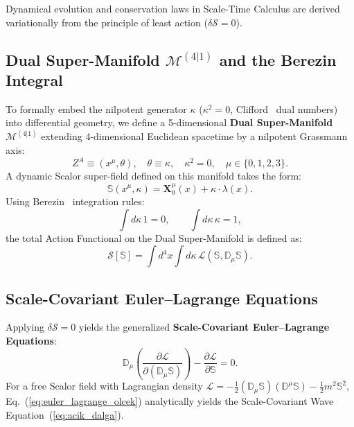 \documentclass[11pt,a4paper]{article}
\begin{document}
Dynamical evolution and conservation laws in Scale-Time Calculus are derived variationally from the principle of least action ($\delta \mathcal{S} = 0$).

\subsection{Dual Super-Manifold $\mathcal{M}^{(4|1)}$ and the Berezin Integral}
To formally embed the nilpotent generator $\kappa$ ($\kappa^2 = 0$, Clifford~\cite{clifford1873} dual numbers) into differential geometry, we define a 5-dimensional \textbf{Dual Super-Manifold} $\mathcal{M}^{(4|1)}$ extending 4-dimensional Euclidean spacetime by a nilpotent Grassmann axis:
\begin{equation}
    Z^A \equiv \left( x^\mu, \theta \right), \quad \theta \equiv \kappa, \quad \kappa^2 = 0, \quad \mu \in \{0, 1, 2, 3\}.
    \label{eq:super_koordinat_sc}
\end{equation}
A dynamic Scalor super-field defined on this manifold takes the form:
\begin{equation}
    \mathbb{S}\left(x^\mu, \kappa\right) = \mathbf{X}_0^\mu(x) + \kappa \cdot \lambda(x).
    \label{eq:skalor_super_alan_sc}
\end{equation}
Using Berezin~\cite{berezin1966} integration rules:
\begin{equation}
    \int d\kappa \, 1 = 0, \qquad \int d\kappa \, \kappa = 1,
    \label{eq:berezin_kurallari_sc}
\end{equation}
the total Action Functional on the Dual Super-Manifold is defined as:
\begin{equation}
    \mathcal{S}[\mathbb{S}] = \int d^4x \int d\kappa \, \mathcal{L}\left(\mathbb{S}, \mathbb{D}_\mu \mathbb{S}\right).
    \label{eq:skalor_eylem_fonksiyoneli_sc}
\end{equation}

\subsection{Scale-Covariant Euler--Lagrange Equations}
Applying $\delta \mathcal{S} = 0$ yields the generalized \textbf{Scale-Covariant Euler--Lagrange Equations}:
\begin{equation}
    \mathbb{D}_\mu \left( \frac{\partial \mathcal{L}}{\partial (\mathbb{D}_\mu \mathbb{S})} \right) - \frac{\partial \mathcal{L}}{\partial \mathbb{S}} = 0.
    \label{eq:euler_lagrange_olcek}
\end{equation}
For a free Scalor field with Lagrangian density $\mathcal{L} = -\frac{1}{2} (\mathbb{D}_\mu \mathbb{S})(\mathbb{D}^\mu \mathbb{S}) - \frac{1}{2} m^2 \mathbb{S}^2$, Eq.~(\ref{eq:euler_lagrange_olcek}) analytically yields the Scale-Covariant Wave Equation~(\ref{eq:acik_dalga}).
\end{document}
